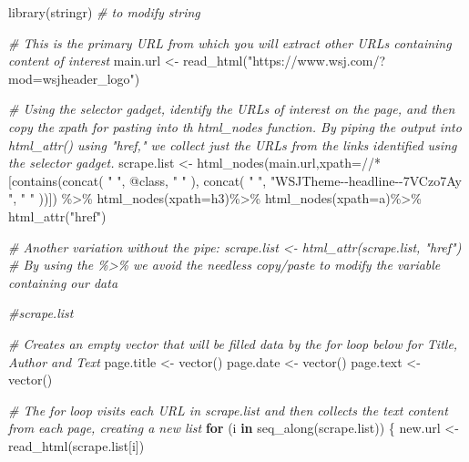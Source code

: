 \documentclass[
]{article}
\newenvironment{Shaded}{\begin{snugshade}}{\end{snugshade}}
\newcommand{\AttributeTok}[1]{\textcolor[rgb]{0.77,0.63,0.00}{#1}}
\newcommand{\CommentTok}[1]{\textcolor[rgb]{0.56,0.35,0.01}{\textit{#1}}}
\newcommand{\ControlFlowTok}[1]{\textcolor[rgb]{0.13,0.29,0.53}{\textbf{#1}}}
\newcommand{\FunctionTok}[1]{\textcolor[rgb]{0.00,0.00,0.00}{#1}}
\newcommand{\NormalTok}[1]{#1}
\newcommand{\OtherTok}[1]{\textcolor[rgb]{0.56,0.35,0.01}{#1}}
\newcommand{\SpecialCharTok}[1]{\textcolor[rgb]{0.00,0.00,0.00}{#1}}
\newcommand{\StringTok}[1]{\textcolor[rgb]{0.31,0.60,0.02}{#1}}
\begin{document}
\begin{Shaded}
\begin{Highlighting}[]
\FunctionTok{library}\NormalTok{(stringr) }\CommentTok{\# to modify string }

\CommentTok{\# This is the primary URL from which you will extract other URLs containing content of interest}
\NormalTok{main.url }\OtherTok{\textless{}{-}} \FunctionTok{read\_html}\NormalTok{(}\StringTok{"https://www.wsj.com/?mod=wsjheader\_logo"}\NormalTok{)}

\CommentTok{\# Using the selector gadget, identify the URLs of interest on the page, and then copy the xpath for pasting into th html\_nodes function. By piping the output into html\_attr() using "href," we collect just the URLs from the links identified using the selector gadget.}
\NormalTok{scrape.list }\OtherTok{\textless{}{-}} \FunctionTok{html\_nodes}\NormalTok{(main.url,}\AttributeTok{xpath=}\StringTok{\textquotesingle{}//*[contains(concat( " ", @class, " " ), concat( " ", "WSJTheme{-}{-}headline{-}{-}7VCzo7Ay ", " " ))]\textquotesingle{}}\NormalTok{) }\SpecialCharTok{\%\textgreater{}\%}
  \FunctionTok{html\_nodes}\NormalTok{(}\AttributeTok{xpath=}\StringTok{\textquotesingle{}h3\textquotesingle{}}\NormalTok{)}\SpecialCharTok{\%\textgreater{}\%} 
  \FunctionTok{html\_nodes}\NormalTok{(}\AttributeTok{xpath=}\StringTok{\textquotesingle{}a\textquotesingle{}}\NormalTok{)}\SpecialCharTok{\%\textgreater{}\%}  
  \FunctionTok{html\_attr}\NormalTok{(}\StringTok{"href"}\NormalTok{)}

\CommentTok{\# Another variation without the pipe: scrape.list \textless{}{-} html\_attr(scrape.list, "href")}
\CommentTok{\# By using the \%\textgreater{}\% we avoid the needless copy/paste to modify the variable containing our data}


 \CommentTok{\#scrape.list}


\CommentTok{\# Creates an empty vector that will be filled data by the \textquotesingle{}for loop\textquotesingle{} below for Title, Author and Text}
\NormalTok{page.title }\OtherTok{\textless{}{-}} \FunctionTok{vector}\NormalTok{()}
\NormalTok{page.date }\OtherTok{\textless{}{-}} \FunctionTok{vector}\NormalTok{()}
\NormalTok{page.text }\OtherTok{\textless{}{-}} \FunctionTok{vector}\NormalTok{()}


\CommentTok{\# The for loop visits each URL in scrape.list and then collects the text content from each page, creating a new list}
\ControlFlowTok{for}\NormalTok{ (i }\ControlFlowTok{in} \FunctionTok{seq\_along}\NormalTok{(scrape.list)) \{}
\NormalTok{  new.url }\OtherTok{\textless{}{-}} \FunctionTok{read\_html}\NormalTok{(scrape.list[i])}
  

\end{Highlighting}
\end{Shaded}
\end{document}
